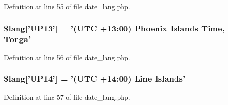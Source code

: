 Definition at line 55 of file date\-\_\-lang.\-php.

\hypertarget{date__lang_8php_ac197fec09ff547ca12a7fe3ffc5908ae}{
\subsubsection[{\$lang}]{\setlength{\rightskip}{0pt plus 5cm}\$lang\mbox{[}'U\-P13'\mbox{]} = '(U\-T\-C +13\-:00) Phoenix Islands Time, Tonga'}}\label{date__lang_8php_ac197fec09ff547ca12a7fe3ffc5908ae}


Definition at line 56 of file date\-\_\-lang.\-php.

\hypertarget{date__lang_8php_a50562230c497ebdba1f540d409110fce}{
\subsubsection[{\$lang}]{\setlength{\rightskip}{0pt plus 5cm}\$lang\mbox{[}'U\-P14'\mbox{]} = '(U\-T\-C +14\-:00) Line Islands'}}\label{date__lang_8php_a50562230c497ebdba1f540d409110fce}


Definition at line 57 of file date\-\_\-lang.\-php.

